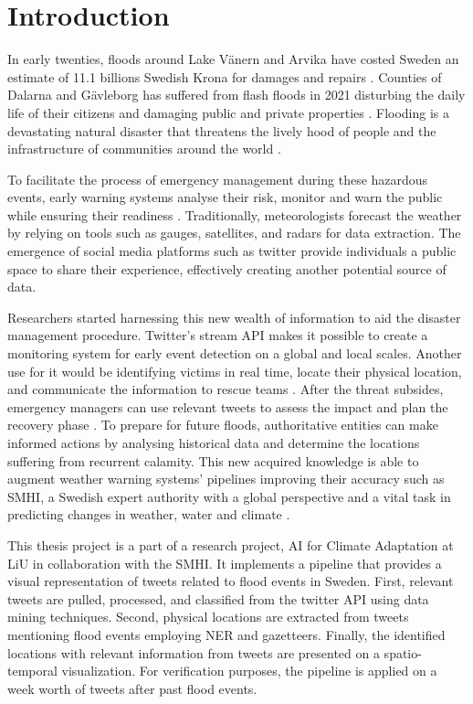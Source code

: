 \section{Introduction}

In early twenties, floods around Lake Vänern and Arvika have costed Sweden an estimate of 11.1
billions Swedish Krona for damages and repairs \cite{RiverFloodsSweden2022}. Counties of Dalarna and
Gävleborg has suffered from flash floods in 2021 disturbing the daily life of their citizens and
damaging public and private properties \cite{daviesSwedenFlashFloods2021}.  Flooding is a
devastating natural disaster that threatens the lively hood of people and the infrastructure of
communities around the world \cite{Floodlist2021}.

To facilitate the process of emergency management during these hazardous events, early warning
systems analyse their risk, monitor and warn the public while ensuring their readiness
\cite{contributorsEarlyWarningSystem2022}. Traditionally, meteorologists forecast the weather by
relying on tools such as gauges, satellites, and radars for data extraction. The emergence of social
media platforms such as twitter provide individuals a public space to share their experience,
effectively creating another potential source of data.

Researchers started harnessing this new wealth of information to aid the disaster management
procedure.  Twitter's stream API makes it possible to create a monitoring system for early event
detection on a global \cite{debruijnGlobalDatabaseHistoric2019b} and local
\cite{barkerDevelopmentNationalscaleRealtime2019} scales. Another use for it would be identifying
victims in real time, locate their physical location, and communicate the information to rescue
teams \cite{singhEventClassificationLocation2019c}. After the threat subsides, emergency
managers can use relevant tweets to assess the impact and plan the recovery phase
\cite{barkerDevelopmentNationalscaleRealtime2019}. To prepare for future floods, authoritative
entities can make informed actions by analysing historical data and determine the locations
suffering from recurrent calamity. This new acquired knowledge is able to augment weather warning
systems' pipelines improving their accuracy such as \ac{SMHI}, a Swedish expert authority with a
global perspective and a vital task in predicting changes in weather, water and climate \cite{SMHI2021}.


This thesis project is a part of a research project, AI for Climate Adaptation
\cite{nesetAI4ClimateAdaptation} at \ac{LiU} in collaboration with the \ac{SMHI}. It implements a
pipeline that provides a visual representation of tweets related to flood events in Sweden. First,
relevant tweets are pulled, processed, and classified from the twitter API using data mining
techniques. Second, physical locations are extracted from tweets mentioning flood events employing
\ac{NER} and gazetteers. Finally, the identified locations with relevant information from tweets are
presented on a spatio-temporal visualization. For verification purposes, the pipeline is applied on
a week worth of tweets after past flood events.
